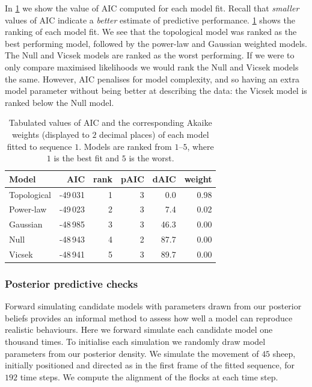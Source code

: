 In \cref{tab:aic_seq1} we show the value of AIC computed for each model fit.
Recall that \emph{smaller} values of AIC indicate a \emph{better} estimate of
predictive performance. \cref{tab:aic_seq1} shows the ranking of each model
fit. We see that the topological model was ranked as the best performing model,
followed by the power-law and Gaussian weighted models. The Null and Vicsek
models are ranked as the worst performing. If we were to only compare maximised
likelihoods we would rank the Null and Vicsek models the same. However, AIC
penalises for model complexity, and so having an extra model parameter without
being better at describing the data: the Vicsek model is ranked below the Null
model.

\begin{table}[tbp]
\begin{tabular}{@{}lrrrrr@{}}
\toprule
Model                       &      AIC & rank & pAIC & dAIC & weight \\
\midrule
Topological                 & -49\,031 &    1 &  3 &  0.0 &   0.98 \\
Power-law                   & -49\,023 &    2 &  3 &  7.4 &   0.02 \\
Gaussian                    & -48\,985 &    3 &  3 & 46.3 &   0.00 \\
Null                        & -48\,943 &    4 &  2 & 87.7 &   0.00 \\
Vicsek                      & -48\,941 &    5 &  3 & 89.7 &   0.00 \\
\bottomrule
\end{tabular}
\caption{Tabulated values of AIC and the corresponding Akaike weights
  (displayed to $2$ decimal places) of each model fitted to sequence $1$. Models
  are ranked from $1$--$5$, where $1$ is the best fit and $5$ is the worst.}
\label{tab:aic_seq1}
\end{table}

\subsubsection{Posterior predictive checks}

Forward simulating candidate models with parameters drawn from our posterior
beliefs provides an informal method to assess how well a model can reproduce
realistic behaviours. Here we forward simulate each candidate model one
thousand times. To initialise each simulation we randomly draw model parameters
from our posterior density. We simulate the movement of $45$ sheep, initially
positioned and directed as in the first frame of the fitted sequence, for $192$
time steps. We compute the alignment of the flocks at each time step.

